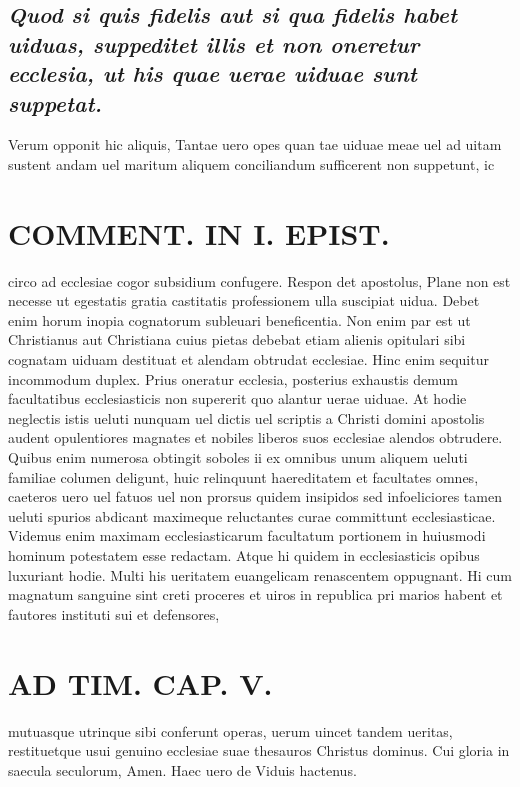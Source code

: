 \documentclass{article}
\begin{document}
\begin{pages}
\subsection*{\textit{Quod si quis fidelis aut si qua fidelis habet uiduas, suppeditet illis et non oneretur ecclesia, ut his quae uerae uiduae sunt suppetat. }}\pstart Verum opponit hic aliquis, Tantae uero opes quan tae uiduae meae uel ad uitam sustent andam uel maritum aliquem conciliandum sufficerent non suppetunt, ic\pend
\section*{COMMENT. IN I. EPIST. }\pstart circo ad ecclesiae cogor subsidium confugere. Respon det apostolus, Plane non est necesse ut egestatis gratia castitatis professionem ulla suscipiat uidua. Debet enim horum inopia cognatorum subleuari beneficentia. Non enim par est ut Christianus aut Christiana cuius pietas debebat etiam alienis opitulari sibi cognatam uiduam destituat et alendam obtrudat ecclesiae. Hinc enim sequitur incommodum duplex. Prius oneratur ecclesia, posterius exhaustis demum facultatibus ecclesiasticis non supererit quo alantur uerae uiduae. At hodie neglectis istis ueluti nunquam uel dictis uel scriptis a Christi domini apostolis audent opulentiores magnates et nobiles liberos suos ecclesiae alendos obtrudere. Quibus enim numerosa obtingit soboles ii ex omnibus unum aliquem ueluti familiae columen deligunt, huic relinquunt haereditatem et facultates omnes, caeteros uero uel fatuos uel non prorsus quidem insipidos sed infoeliciores tamen ueluti spurios abdicant maximeque reluctantes curae committunt ecclesiasticae. Videmus enim maximam ecclesiasticarum facultatum portionem in huiusmodi hominum potestatem esse redactam. Atque hi quidem in ecclesiasticis opibus luxuriant hodie. Multi his ueritatem euangelicam renascentem oppugnant. Hi cum magnatum sanguine sint creti proceres et uiros in republica pri marios habent et fautores instituti sui et defensores,  \pend
\section*{AD TIM. CAP. V. }
\marginpar{[ p.156 ]}\pstart mutuasque utrinque sibi conferunt operas, uerum uincet tandem ueritas, restituetque usui genuino ecclesiae suae thesauros Christus dominus. Cui gloria in saecula seculorum, Amen. Haec uero de Viduis hactenus.  \pend
{}
{}

\end{pages}
\end{document}
